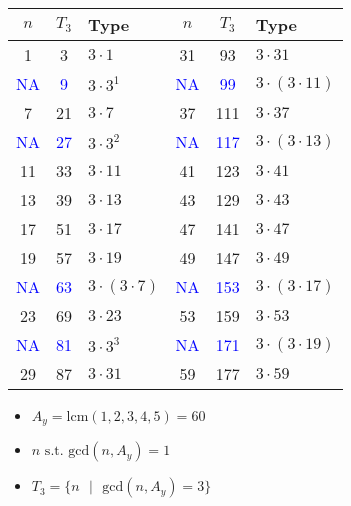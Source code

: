 \documentclass[12pt]{amsart}
\theoremstyle{definition}
\numberwithin{equation}{section}
\begin{document}
\begin{center}
\begin{table}[]
    \centering
    \begin{tabular}{| c | c | l || c | c | l|}
\hline
 $n$ & $T_3$ & Type & $n$ & $T_3$ & Type \\
 \hline
1                       & 3                     & $3 \cdot 1$           & 31                      & 93                      & $3 \cdot 31$\\
\textcolor{blue}{NA}    & \textcolor{blue}{9}   & $3 \cdot 3^1$         & \textcolor{blue}{NA}    & \textcolor{blue}{99}    & $3 \cdot (3 \cdot 11)$\\
7                       & 21                    & $3 \cdot 7$           & 37                      & 111                     & $3 \cdot 37$\\
\textcolor{blue}{NA}    & \textcolor{blue}{27}  & $3 \cdot 3^2$         & \textcolor{blue}{NA}    & \textcolor{blue}{117}   & $3 \cdot (3 \cdot 13)$\\
11                      & 33                    & $3 \cdot 11$          & 41                      & 123                     & $3 \cdot 41$\\
13                      & 39                    & $3 \cdot 13$          & 43                      & 129                     & $3 \cdot 43$\\
17                      & 51                    & $3 \cdot 17$          & 47                      & 141                     & $3 \cdot 47$\\
19                      & 57                    & $3 \cdot 19$          & 49                      & 147                     & $3 \cdot 49$\\
\textcolor{blue}{NA}    & \textcolor{blue}{63}  & $3 \cdot (3 \cdot 7)$ & \textcolor{blue}{NA}    & \textcolor{blue}{153}   & $3 \cdot (3 \cdot 17)$\\
23                      & 69                    & $3 \cdot 23$          & 53                      & 159                     & $3 \cdot 53$\\
\textcolor{blue}{NA}    & \textcolor{blue}{81}  & $3 \cdot 3^3$          & \textcolor{blue}{NA}    & \textcolor{blue}{171}   & $3 \cdot (3 \cdot 19)$\\
29                      & 87                    & $3 \cdot 31$          & 59                      & 177                     & $3 \cdot 59$\\


\hline
\end{tabular}
\end{table}
\begin{itemize}
    \item $A_y = \text{lcm}(1,2,3,4,5) = 60$ 
    \item $n \text{ s.t. gcd}(n, A_y) = 1$ 
    \item $T_3 = \{n \text{ }| \text{ }\text{gcd}(n, A_y) = 3\}$
\end{itemize}
\end{center}
\end{document}
